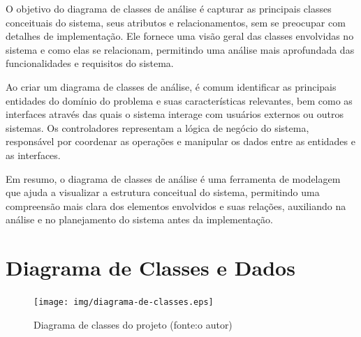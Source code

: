 \documentclass[
	12pt,				%
	openright,			%
	twoside,			%
	a4paper,			%
	english,			%
	brazil				%
	]{abntex2}
\begin{document}
O objetivo do diagrama de classes de análise é capturar as principais classes conceituais do sistema, seus atributos e relacionamentos, sem se preocupar com detalhes de implementação. Ele fornece uma visão geral das classes envolvidas no sistema e como elas se relacionam, permitindo uma análise mais aprofundada das funcionalidades e requisitos do sistema.

Ao criar um diagrama de classes de análise, é comum identificar as principais entidades do domínio do problema e suas características relevantes, bem como as interfaces através das quais o sistema interage com usuários externos ou outros sistemas. Os controladores representam a lógica de negócio do sistema, responsável por coordenar as operações e manipular os dados entre as entidades e as interfaces.

Em resumo, o diagrama de classes de análise é uma ferramenta de modelagem que ajuda a visualizar a estrutura conceitual do sistema, permitindo uma compreensão mais clara dos elementos envolvidos e suas relações, auxiliando na análise e no planejamento do sistema antes da implementação.

\clearpage

\section{Diagrama de Classes e Dados}\label{diagrama_de_classes}

\begin{figure}[htb] %
	\centering
	\texttt{[image: img/diagrama-de-classes.eps]}
	\caption{Diagrama de classes do projeto (fonte:o autor)} 
	\label{fig:diagrama_de_classes}
\end{figure}


\end{document}
